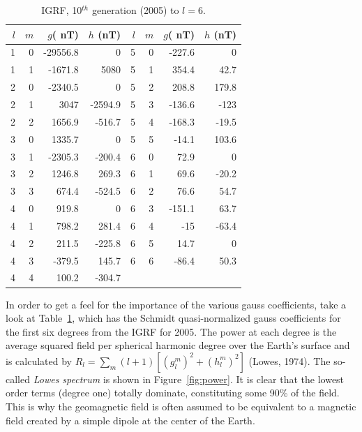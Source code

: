 \begin{table}[h!tb]
\begin{center}
\caption {IGRF,  10$^{th}$ generation (2005) to $l=6$.}
\label{tab:igrf05}
\begin{tabular}{r r r r|rrrr}
\hline
$l$&$m$&$g $( nT) &$h$ (nT) & $l$&$m$&$g $( nT) &$h$ (nT) \\
\hline
1 & 0 & -29556.8 & 0 & 5 & 0 & -227.6 & 0\\
1 & 1 & -1671.8 & 5080 & 5 & 1 & 354.4 & 42.7\\
2 & 0 & -2340.5 & 0 & 5 & 2 & 208.8 & 179.8\\
2 & 1 & 3047 & -2594.9 & 5 & 3 & -136.6 & -123\\
2 & 2 & 1656.9 & -516.7 & 5 & 4 & -168.3 & -19.5\\
3 & 0 & 1335.7 & 0 & 5 & 5 & -14.1 & 103.6\\
3 & 1 & -2305.3 & -200.4 & 6 & 0 & 72.9 & 0\\
3 & 2 & 1246.8 & 269.3 & 6 & 1 & 69.6 & -20.2\\
3 & 3 & 674.4 & -524.5 & 6 & 2 & 76.6 & 54.7\\
4 & 0 & 919.8 & 0 & 6 & 3 & -151.1 & 63.7\\
4 & 1 & 798.2 & 281.4 & 6 & 4 & -15 & -63.4\\
4 & 2 & 211.5 & -225.8 & 6 & 5 & 14.7 & 0\\
4 & 3 & -379.5 & 145.7 & 6 & 6 & -86.4 & 50.3\\
4 & 4 & 100.2 & -304.7 &  &  &  & \\
 \hline
\end{tabular}
\end{center}
\end{table}
  


In order to get a feel for the importance of the various gauss coefficients, take a look at Table~\ref{tab:igrf05}, which has the Schmidt quasi-normalized gauss coefficients for the first six degrees from the IGRF for 2005.   
The power at each degree is the average squared field per spherical harmonic degree over the Earth's surface and is calculated by  $R_l=\sum_m (l+1)[(g_l^m)^2 + (h_l^m)^2]$
 \nocite{lowes74} 
(Lowes, 1974). 
The  so-called 
{\it Lowes spectrum} is shown in 
Figure~\ref{fig:power}.  It is clear that the lowest order terms (degree one) totally
dominate,   constituting some 90\% of the field.    This is why the geomagnetic field is often assumed to be equivalent to a magnetic field created by a simple dipole at the center of the Earth.   



